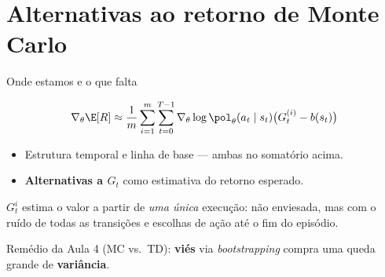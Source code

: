 \documentclass[aspectratio=169, 11pt]{beamer}
\newcommand{\thv}{\theta}                       %
\newcommand{\polth}{\pol_{\thv}}                %
\newcommand{\gth}{\nabla_{\thv}}                %
\begin{document}
\section{Alternativas ao retorno de Monte Carlo}

\begin{frame}{Onde estamos e o que falta}

  \[
    \gth \E[R] \approx \frac{1}{m}\sum_{i=1}^{m}\sum_{t=0}^{T-1}
      \gth \log \polth(a_t\mid s_t)\bigl(G^{(i)}_t - b(s_t)\bigr)
  \]

  \begin{itemize}\setlength{\itemsep}{0.15ex}
    \item[\checkmark] Estrutura temporal e linha de base --- ambas no
      somatório acima.
    \item[$\square$] \textbf{Alternativas a $G_t$} como estimativa do retorno
      esperado.
  \end{itemize}

  \begin{alertabox}
    $G^i_t$ estima o valor a partir de \emph{uma única} execução: não
    enviesada, mas com o ruído de todas as transições e escolhas de ação até
    o fim do episódio.
  \end{alertabox}

  \begin{ideiabox}
    Remédio da Aula 4 (MC vs.\ TD): \textbf{viés} via \emph{bootstrapping}
    compra uma queda grande de \textbf{variância}.
  \end{ideiabox}
\end{frame}
\end{document}
